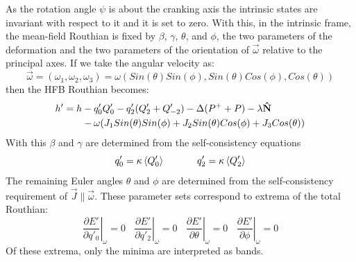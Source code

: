 As the rotation angle $\psi$ is about the cranking axis the intrinsic states are invariant with respect to it and it is set to zero. With this, in the intrinsic frame, the mean-field Routhian is fixed by $\beta$, $\gamma$, $\theta$, and $\phi$, the two parameters of the deformation and the two parameters of the orientation of $\vec{\omega}$ relative to the principal axes. If we take the angular velocity as:
\begin{equation}
\label{eqn:chp2-ang-vel-vec}
\vec{\omega}=(\omega_1,\omega_2,\omega_3)=\omega(Sin(\theta)Sin(\phi),Sin(\theta)Cos(\phi),Cos(\theta))
\end{equation}
then the HFB Routhian becomes:
\begin{align}
\label{eqn:chp2-TAC-HFB-intrin-routh-rewrite}
h'=h& -q'_0Q'_0-q'_2(Q'_2+Q'_{-2})-\Delta(P^++P)-\lambda\boldsymbol{\hat{\textbf{N}}} \\
&- \omega(J_1Sin(\theta)Sin(\phi)+J_2Sin(\theta)Cos(\phi)+J_3Cos(\theta)) \nonumber
\end{align}
With this $\beta$ and $\gamma$ are determined from the self-consistency equations
\begin{equation}
\label{eqn:chp2-TAC-beta-gamma-self-consist}
q'_0=\kappa\Braket{Q'_0}~~~~~~~~~~q'_2=\kappa\Braket{Q'_2}
\end{equation}
The remaining Euler angles $\theta$ and $\phi$ are determined from the self-consistency requirement of $\vec{J}\parallel\vec{\omega}$. These parameter sets correspond to extrema of the total Routhian:
\begin{equation}
\label{eqn:chp2-tac-extrema-cond2}
\left. \frac{\partial{}E'}{\partial{}q'_{0}} \right|_{\omega}=0 ~~~~ \left. \frac{\partial{}E'}{\partial{}q'_{2}} \right|_{\omega}=0 ~~~~ \left. \frac{\partial{}E'}{\partial\theta} \right|_{\omega}=0 ~~~~ \left. \frac{\partial{}E'}{\partial\phi} \right|_{\omega}=0
\end{equation}
Of these extrema, only the minima are interpreted as bands.


